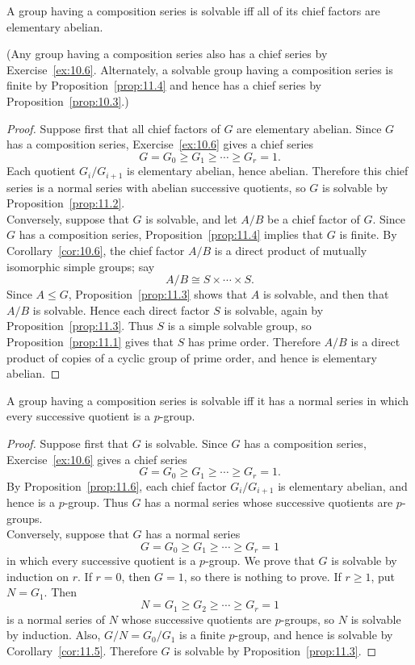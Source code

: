 \documentclass[../Odyssey_Project.tex]{subfiles}
\begin{document}
\begin{proposition}
\label{prop:11.6}
A group having a composition series is solvable iff all of its chief factors are elementary abelian.

(Any group having a composition series also has a chief series by Exercise~\ref{ex:10.6}. Alternately, a solvable group having a composition series is finite by Proposition~\ref{prop:11.4} and hence has a chief series by Proposition~\ref{prop:10.3}.)
\end{proposition}
\begin{proof}
    Suppose first that all chief factors of $G$ are elementary abelian. Since $G$ has a composition series, Exercise~\ref{ex:10.6} gives a chief series
    \[
        G = G_0 \geq G_1 \geq \cdots \geq G_r = 1.
    \]
    Each quotient $G_i/G_{i+1}$ is elementary abelian, hence abelian. Therefore this chief series is a normal series with abelian successive quotients, so $G$ is solvable by Proposition~\ref{prop:11.2}. \\
    Conversely, suppose that $G$ is solvable, and let $A/B$ be a chief factor of $G$. Since $G$ has a composition series, Proposition~\ref{prop:11.4} implies that $G$ is finite. By Corollary~\ref{cor:10.6}, the chief factor $A/B$ is a direct product of mutually isomorphic simple groups; say
    \[
        A/B \cong S\times \cdots \times S.
    \]
    Since $A \leq G$, Proposition~\ref{prop:11.3} shows that $A$ is solvable, and then that $A/B$ is solvable. Hence each direct factor $S$ is solvable, again by Proposition~\ref{prop:11.3}. Thus $S$ is a simple solvable group, so Proposition~\ref{prop:11.1} gives that $S$ has prime order. Therefore $A/B$ is a direct product of copies of a cyclic group of prime order, and hence is elementary abelian.
\end{proof}

\begin{corollary}
\label{cor:11.7}
A group having a composition series is solvable iff it has a normal series in which every successive quotient is a $p$-group.
\end{corollary}
\begin{proof}
    Suppose first that $G$ is solvable. Since $G$ has a composition series, Exercise~\ref{ex:10.6} gives a chief series
    \[
        G = G_0 \geq G_1 \geq \cdots \geq G_r = 1.
    \]
    By Proposition~\ref{prop:11.6}, each chief factor $G_i/G_{i+1}$ is elementary abelian, and hence is a $p$-group. Thus $G$ has a normal series whose successive quotients are $p$-groups. \\
    Conversely, suppose that $G$ has a normal series
    \[
        G = G_0 \geq G_1 \geq \cdots \geq G_r = 1
    \]
    in which every successive quotient is a $p$-group. We prove that $G$ is solvable by induction on $r$. If $r=0$, then $G=1$, so there is nothing to prove. If $r\geq 1$, put $N=G_1$. Then
    \[
        N = G_1 \geq G_2 \geq \cdots \geq G_r = 1
    \]
    is a normal series of $N$ whose successive quotients are $p$-groups, so $N$ is solvable by induction. Also, $G/N = G_0/G_1$ is a finite $p$-group, and hence is solvable by Corollary~\ref{cor:11.5}. Therefore $G$ is solvable by Proposition~\ref{prop:11.3}.
\end{proof}
\end{document}
